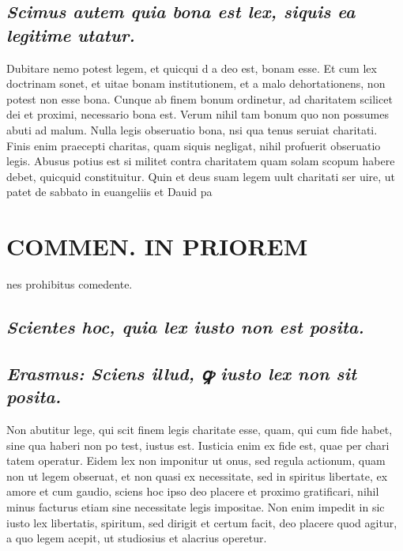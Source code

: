 \documentclass{article}
\begin{document}
\begin{pages}
\subsection*{\textit{Scimus autem quia bona est lex, siquis ea legitime utatur. }}\pstart Dubitare nemo potest legem, et quicqui d a deo est, bonam esse. Et cum lex doctrinam sonet, et uitae bonam institutionem, et a malo dehortationens, non potest non esse bona. Cunque ab finem bonum ordinetur, ad charitatem scilicet dei et proximi, necessario bona est. Verum nihil tam bonum quo non possumes abuti ad malum. Nulla legis obseruatio bona, nsi qua tenus seruiat charitati. Finis enim praecepti charitas, quam siquis negligat, nihil profuerit obseruatio legis. Abusus potius est si militet contra charitatem quam solam scopum habere debet, quicquid constituitur. Quin et deus suam legem uult charitati ser uire, ut patet de sabbato in euangeliis et Dauid pa  \pend
\section*{COMMEN. IN PRIOREM }
\marginpar{[ p.18 ]}\pstart nes prohibitus comedente.  \pend
{}
{}
\subsection*{\textit{Scientes hoc, quia lex iusto non est posita. }}
{}
\subsection*{\textit{Erasmus: Sciens illud, ꝙ iusto lex non sit posita. }}\pstart Non abutitur lege, qui scit finem legis charitate esse, quam, qui cum fide habet, sine qua haberi non po test, iustus est. Iusticia enim ex fide est, quae per chari tatem operatur. Eidem lex non imponitur ut onus, sed regula actionum, quam non ut legem obseruat, et non quasi ex necessitate, sed in spiritus libertate, ex amore et cum gaudio, sciens hoc ipso deo placere et proximo gratificari, nihil minus facturus etiam sine necessitate legis impositae. Non enim impedit in sic iusto lex libertatis, spiritum, sed dirigit et certum facit, deo placere quod agitur, a quo legem acepit, ut studiosius et alacrius operetur.  \pend
{}
{}

\end{pages}
\end{document}

